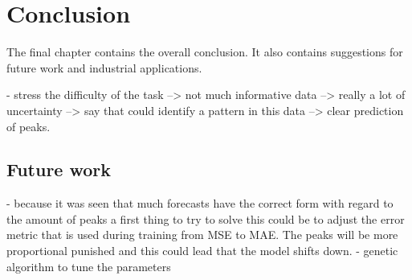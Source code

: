 \chapter{Conclusion}
\label{cha:conclusion}
The final chapter contains the overall conclusion. It also contains
suggestions for future work and industrial applications.



- stress the difficulty of the task --> not much informative data --> really a lot of uncertainty --> say that could identify a pattern in this data --> clear prediction of peaks.


\section{Future work}
- because it was seen that much forecasts have the correct form with regard to the amount of peaks a first thing to try to solve this could be to adjust the error metric that is used during training from MSE to MAE. The peaks will be more proportional punished and this could lead that the model shifts down. 
- genetic algorithm to tune the parameters


